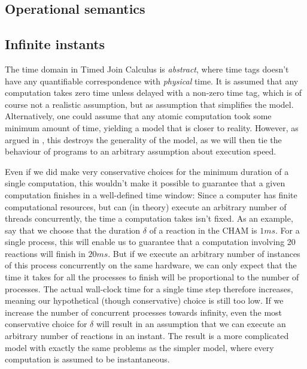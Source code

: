 \subsection{Operational semantics}



\subsection{Infinite instants}

The time domain in Timed Join Calculus is \emph{abstract}, where time
tags doesn't have any quantifiable correspondence with \emph{physical}
time. It is assumed that any computation takes zero time unless
delayed with a non-zero time tag, which is of course not a realistic
assumption, but as assumption that simplifies the model.
Alternatively, one could assume that any atomic computation took some
minimum amount of time, yielding a model that is closer to reality.
However, as argued in \cite{nicollin-overview}, this destroys the
generality of the model, as we will then tie the behaviour of programs
to an arbitrary assumption about execution speed.

Even if we did make very conservative choices for the minimum duration
of a single computation, this wouldn't make it possible to guarantee
that a given computation finishes in a well-defined time window: Since
a computer has finite computational resources, but can (in theory)
execute an arbitrary number of threads concurrently, the time a
computation takes isn't fixed. As an example, say that we choose that
the duration $\delta$ of a reaction in the CHAM is $1 ms$. For a
single process, this will enable us to guarantee that a computation
involving 20 reactions will finish in $20 ms$. But if we execute an
arbitrary number of instances of this process concurrently on the same
hardware, we can only expect that the time it takes for all the
processes to finish will be proportional to the number of processes.
The actual wall-clock time for a single time step therefore increases,
meaning our hypothetical (though conservative) choice is still too
low. If we increase the number of concurrent processes towards
infinity, even the most conservative choice for $\delta$ will result
in an assumption that we can execute an arbitrary number of reactions
in an instant. The result is a more complicated model with exactly the
same problems as the simpler model, where every computation is assumed
to be instantaneous.

